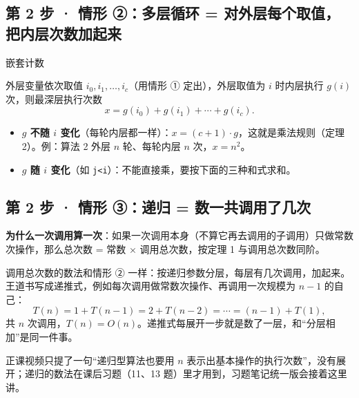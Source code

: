 \documentclass[10.5pt,a4paper,oneside]{article}
\providecommand{\tightlist}{\setlength{\itemsep}{2pt}\setlength{\parskip}{0pt}}
\begin{document}
\hypertarget{ux7b2c-2-ux6b65-ux60c5ux5f62-ux2461ux591aux5c42ux5faaux73af-ux5bf9ux5916ux5c42ux6bcfux4e2aux53d6ux503cux628aux5185ux5c42ux6b21ux6570ux52a0ux8d77ux6765}{%
\subsection{第 2 步 · 情形 ②：多层循环 =
对外层每个取值，把内层次数加起来}\label{ux7b2c-2-ux6b65-ux60c5ux5f62-ux2461ux591aux5c42ux5faaux73af-ux5bf9ux5916ux5c42ux6bcfux4e2aux53d6ux503cux628aux5185ux5c42ux6b21ux6570ux52a0ux8d77ux6765}}

\begin{thmbox}{嵌套计数}

外层变量依次取值 \(i_0,i_1,\dots,i_c\)（用情形 ① 定出），外层取值为
\(i\) 时内层执行 \(g(i)\) 次，则最深层执行次数
\[x=g(i_0)+g(i_1)+\cdots+g(i_c).\]

\end{thmbox}

\begin{itemize}
\tightlist
\item
  \textbf{\(g\) 不随 \(i\)
  变化}（每轮内层都一样）：\(x=(c+1)\cdot g\)，这就是乘法规则（定理
  2）。例：算法 2 外层 \(n\) 轮、每轮内层 \(n\) 次，\(x=n^2\)。
\item
  \textbf{\(g\) 随 \(i\) 变化}（如
  \texttt{j\textless{}i}）：不能直接乘，要按下面的三种和式求和。
\end{itemize}

\hypertarget{ux7b2c-2-ux6b65-ux60c5ux5f62-ux2462ux9012ux5f52-ux6570ux4e00ux5171ux8c03ux7528ux4e86ux51e0ux6b21}{%
\subsection{第 2 步 · 情形 ③：递归 =
数一共调用了几次}\label{ux7b2c-2-ux6b65-ux60c5ux5f62-ux2462ux9012ux5f52-ux6570ux4e00ux5171ux8c03ux7528ux4e86ux51e0ux6b21}}

\textbf{为什么一次调用算一次}：如果一次调用本身（不算它再去调用的子调用）只做常数次操作，那么总次数
= 常数 × 调用总次数，按定理 1 与调用总次数同阶。

调用总次数的数法和情形 ②
一样：按递归参数分层，每层有几次调用，加起来。王道书写成递推式，例如每次调用做常数次操作、再调用一次规模为
\(n-1\) 的自己： \[T(n)=1+T(n-1)=2+T(n-2)=\cdots=(n-1)+T(1),\] 共 \(n\)
次调用，\(T(n)=O(n)\)。递推式每展开一步就是数了一层，和“分层相加”是同一件事。

\begin{fixbox}

正课视频只提了一句“递归型算法也要用 \(n\)
表示出基本操作的执行次数”，没有展开；递归的数法在课后习题（11、13
题）里才用到，习题笔记统一版会接着这里讲。

\end{fixbox}
\end{document}
